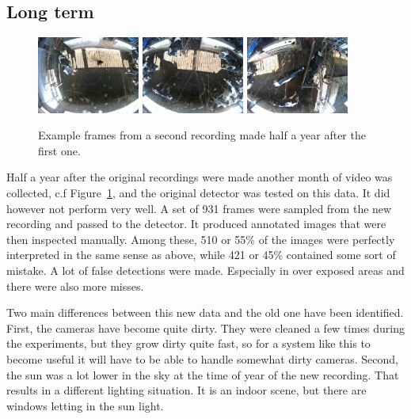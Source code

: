 \documentclass{IET}
\begin{document}
\subsection{Long term}
\begin{figure}[tb]
\begin{center}
  \includegraphics[width=0.3\textwidth]{new-2.jpg}
  \includegraphics[width=0.3\textwidth]{new-1.jpg}
  \includegraphics[width=0.3\textwidth]{new-0.jpg}
\end{center}
  \caption{Example frames from a second recording made half a year after the first one.}
  \label{fig:new}
\end{figure}

Half a year after the original recordings were made another month of video was collected, c.f Figure~\ref{fig:new}, and the original detector was tested on this data. It did however not perform very well. A set of 931 frames were sampled from the new recording and passed to the detector. It produced annotated images that were then inspected manually. Among these, 510 or 55\% of the images were perfectly interpreted in the same sense as above, while 421 or 45\% contained some sort of mistake.
A lot of false detections were made. Especially in over exposed areas and there were also more misses. 

Two main differences between this new data and the old one have been identified. 
First, the cameras have become quite dirty. They were cleaned a few times during the experiments, but they grow dirty quite fast, so for a system like this to become useful it will have to be able to handle somewhat dirty cameras. Second, the sun was a lot lower in the sky at the time of year of the new recording. That results in a different lighting situation. It is an indoor scene, but there are windows letting in the sun light.
\end{document}
